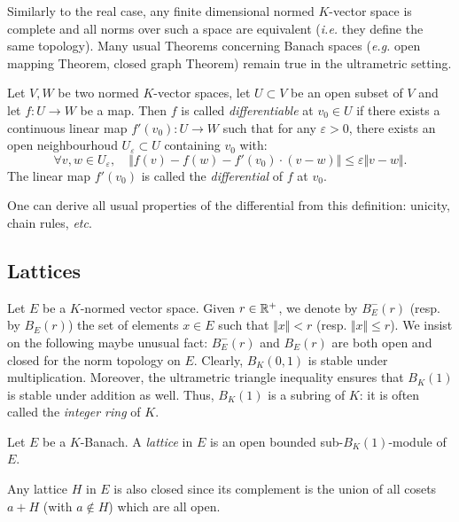 \documentclass{amsart}
\begin{document}
Similarly to the real case, any finite dimensional normed $K$-vector 
space is complete and all norms over such a space are equivalent 
(\emph{i.e.} they define the same topology). Many usual Theorems 
concerning Banach spaces (\emph{e.g.} open mapping Theorem, closed graph 
Theorem) remain true in the ultrametric setting.

\begin{deftn}
Let $V, W$ be two normed $K$-vector spaces, let $U \subset V$ be an open 
subset of $V$ and let $f : U \rightarrow W$ be a map. Then $f$ is called 
\emph{differentiable} at $v_0 \in U$ if there exists a 
continuous linear map $f'(v_0) : U \rightarrow W$ such that for any 
$\varepsilon >0$, there exists an open neighbourhoud $U_\varepsilon 
\subset U$ containing $v_0$ with:
\[ 
\forall v, w \in U_\varepsilon, \quad
\Vert f(v)-f(w)-f'(v_0) \cdot \left( v-w \right) \Vert 
\leq \varepsilon \Vert v-w \Vert. 
\]
The linear map $f'(v_0)$ is called the \emph{differential} of $f$ at $v_0$.
\end{deftn}

One can derive all usual properties of the differential from this 
definition: unicity, chain rules, \emph{etc}.

\subsection{Lattices}

Let $E$ be a $K$-normed vector space. Given $r \in \mathbb R^+$, 
we denote by $B^-_E(r)$ (resp. by $B_E(r)$) the set of elements $x 
\in E$ such that $\Vert x \Vert < r$ (resp. $\Vert x \Vert \leq r$). 
We insist on the following maybe unusual fact: $B^-_E(r)$ and 
$B_E(r)$ are both open and closed for the norm topology on $E$.
Clearly, $B_K(0,1)$ is stable under multiplication. Moreover, the 
ultrametric triangle inequality ensures that $B_K(1)$ is stable under 
addition as well. Thus, $B_K(1)$ is a subring of $K$: it is often 
called the \emph{integer ring} of $K$.

\begin{deftn}
Let $E$ be a $K$-Banach.
A \emph{lattice} in $E$ is an open bounded sub-$B_K(1)$-module of $E$.
\end{deftn}

\begin{rmk}
Any lattice $H$ in $E$ is also closed since its complement is the
union of all cosets $a + H$ (with $a \not\in H$) which are all open.
\end{rmk}
\end{document}
